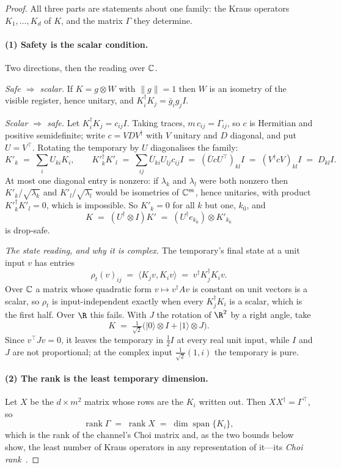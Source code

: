 \documentclass[acmsmall,screen,review,anonymous,nonacm]{acmart}
\begin{document}
\stmtGram
\begin{proof}
All three parts are statements about one family: the Kraus operators $K_1,
\ldots, K_d$ of $K$, and the matrix $\Gamma$ they determine.

\paragraph{(1) Safety is the scalar condition.} Two directions, then the
reading over $\mathbb{C}$.

\emph{Safe $\Rightarrow$ scalar.} If $K = g \otimes W$ with $\|g\| = 1$ then
$W$ is an isometry of the visible register, hence unitary, and
$K_i^{\dagger}K_j = \bar g_i g_j I$.

\emph{Scalar $\Rightarrow$ safe.} Let $K_i^{\dagger}K_j = c_{ij}I$. Taking
traces, $m\,c_{ij} = \Gamma_{ij}$, so $c$ is Hermitian and positive
semidefinite; write $c = V D V^{\dagger}$ with $V$ unitary and $D$ diagonal,
and put $U = V^{\top}$. Rotating the temporary by $U$ diagonalises the
family:
\[
  K'_k \;=\; \sum_i U_{ki} K_i , \qquad
  K'^{\dagger}_k K'_l \;=\; \sum_{ij} \bar U_{ki} U_{lj} c_{ij} I
    \;=\; (\bar U c U^{\top})_{kl} I
    \;=\; (V^{\dagger} c V)_{kl} I \;=\; D_{kl} I .
\]
At most one diagonal entry is nonzero: if $\lambda_k$ and $\lambda_l$ were
both nonzero then $K'_k/\sqrt{\lambda_k}$ and $K'_l/\sqrt{\lambda_l}$ would
be isometries of $\mathbb{C}^{m}$, hence unitaries, with product $K'^{\dagger}_k
K'_l = 0$, which is impossible. So $K'_k = 0$ for all $k$ but one, $k_0$,
and
\[
  K \;=\; (U^{\dagger} \otimes I)K' \;=\; (U^{\dagger} e_{k_0}) \otimes K'_{k_0}
\]
is drop-safe.

\emph{The state reading, and why it is complex.} The temporary's final state
at a unit input $v$ has entries
\[
  \rho_t(v)_{ij} \;=\; \langle K_j v, K_i v\rangle
    \;=\; v^{\dagger} K_j^{\dagger} K_i v .
\]
Over $\mathbb{C}$ a matrix whose quadratic form $v \mapsto v^{\dagger}Av$ is constant
on unit vectors is a scalar, so $\rho_t$ is input-independent exactly when
every $K_j^{\dagger}K_i$ is a scalar, which is the first half. Over $\R$ this
fails. With $J$ the rotation of $\R^{2}$ by a right angle, take
\[
  K \;=\; \tfrac1{\sqrt2}\bigl(|0\rangle \otimes I + |1\rangle \otimes J\bigr).
\]
Since $v^{\top}Jv = 0$, it leaves the temporary in $\tfrac12 I$ at every real
unit input, while $I$ and $J$ are not proportional; at the complex input
$\tfrac1{\sqrt2}(1, i)$ the temporary is pure.

\paragraph{(2) The rank is the least temporary dimension.} Let $X$ be the $d
\times m^{2}$ matrix whose rows are the $K_i$ written out. Then $XX^{\dagger}
= \Gamma^{\top}$, so
\[
  \operatorname{rank}\Gamma \;=\; \operatorname{rank} X
    \;=\; \dim\operatorname{span}\{K_i\} ,
\]
which is the rank of the channel's Choi matrix and, as the two bounds below
show, the least number of Kraus operators in any representation of it---its
\emph{Choi rank}~\cite[p.~78]{Watrous2018TQI}.


\end{proof}
\end{document}
